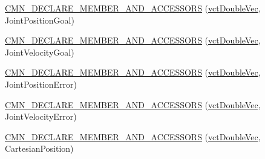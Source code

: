 {\bf }\par
\begin{DoxyCompactItemize}
\item 
\hyperlink{classprm_robot_state_aeda6302c5525f6742919fe801e31ef8f}{C\-M\-N\-\_\-\-D\-E\-C\-L\-A\-R\-E\-\_\-\-M\-E\-M\-B\-E\-R\-\_\-\-A\-N\-D\-\_\-\-A\-C\-C\-E\-S\-S\-O\-R\-S} (\hyperlink{vct_dynamic_vector_types_8h_ade4b3068c86fb88f41af2e5187e491c2}{vct\-Double\-Vec}, Joint\-Position\-Goal)
\end{DoxyCompactItemize}

{\bf }\par
\begin{DoxyCompactItemize}
\item 
\hyperlink{classprm_robot_state_a88664290a459f8303d5990b5fcb607cd}{C\-M\-N\-\_\-\-D\-E\-C\-L\-A\-R\-E\-\_\-\-M\-E\-M\-B\-E\-R\-\_\-\-A\-N\-D\-\_\-\-A\-C\-C\-E\-S\-S\-O\-R\-S} (\hyperlink{vct_dynamic_vector_types_8h_ade4b3068c86fb88f41af2e5187e491c2}{vct\-Double\-Vec}, Joint\-Velocity\-Goal)
\end{DoxyCompactItemize}

{\bf }\par
\begin{DoxyCompactItemize}
\item 
\hyperlink{classprm_robot_state_ab0a13ab8a9d5d48f56dd93af64c31bcc}{C\-M\-N\-\_\-\-D\-E\-C\-L\-A\-R\-E\-\_\-\-M\-E\-M\-B\-E\-R\-\_\-\-A\-N\-D\-\_\-\-A\-C\-C\-E\-S\-S\-O\-R\-S} (\hyperlink{vct_dynamic_vector_types_8h_ade4b3068c86fb88f41af2e5187e491c2}{vct\-Double\-Vec}, Joint\-Position\-Error)
\end{DoxyCompactItemize}

{\bf }\par
\begin{DoxyCompactItemize}
\item 
\hyperlink{classprm_robot_state_a9b673dcbacb983c18950e3477ae5bfe2}{C\-M\-N\-\_\-\-D\-E\-C\-L\-A\-R\-E\-\_\-\-M\-E\-M\-B\-E\-R\-\_\-\-A\-N\-D\-\_\-\-A\-C\-C\-E\-S\-S\-O\-R\-S} (\hyperlink{vct_dynamic_vector_types_8h_ade4b3068c86fb88f41af2e5187e491c2}{vct\-Double\-Vec}, Joint\-Velocity\-Error)
\end{DoxyCompactItemize}

{\bf }\par
\begin{DoxyCompactItemize}
\item 
\hyperlink{classprm_robot_state_acd86b85963d6ff0fcaaf20d203a07337}{C\-M\-N\-\_\-\-D\-E\-C\-L\-A\-R\-E\-\_\-\-M\-E\-M\-B\-E\-R\-\_\-\-A\-N\-D\-\_\-\-A\-C\-C\-E\-S\-S\-O\-R\-S} (\hyperlink{vct_dynamic_vector_types_8h_ade4b3068c86fb88f41af2e5187e491c2}{vct\-Double\-Vec}, Cartesian\-Position)
\end{DoxyCompactItemize}

